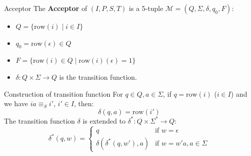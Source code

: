 \documentclass{beamer}
\begin{document}
\begin{frame}{Acceptor}
    The \textbf{Acceptor} of $(I,P,S,T)$ is a 5-tuple $\mathcal{M} = (Q,\Sigma,\delta,q_0,F)$:
    \begin{itemize}
        \item $Q = \{\text{row}(i) \mid i \in I\}$
        \item $q_0 = \text{row}(\epsilon) \in Q$
        \item $F = \{\text{row}(i) \in Q \mid \text{row}(i)(\epsilon) = 1\}$
        \item $\delta \colon Q \times \Sigma \to Q$ is the transition function.
    \end{itemize}
    \begin{block}{Construction of transition function}
        For $q \in Q, a \in \Sigma$, if $q = \text{row}(i)$ ($i \in I$) and we have
        $ia \equiv_{S} i'$, $i' \in I$, then:
        \[
            \delta(q,a) = \text{row}(i')
        \]
        The transition function $\delta$ is extended to $\delta^{*} \colon Q \times \Sigma^{*} \to Q$:
        \[
            \delta^{*}(q,w) = 
            \begin{cases}
                q & \text{if } w = \epsilon \\
                \delta(\delta^*(q,w'),a) & \text{if } w = w'a, a \in \Sigma
            \end{cases}
        \]
    \end{block}
\end{frame}
\end{document}
